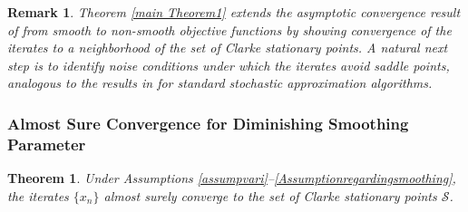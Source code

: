 \documentclass[9pt,journal,twoside,web]{ieeecolor}
\newtheorem{theorem}{Theorem}
\newtheorem{remark}{Remark}
\begin{document}
\begin{remark}
Theorem \ref{main Theorem1} extends the asymptotic convergence result of \cite{Ramaswami} from smooth to non-smooth objective functions by showing convergence of the iterates to a neighborhood of the set of Clarke stationary points. A natural next step is to identify noise conditions under which the iterates avoid saddle points, analogous to the results in \cite{pemantle1990nonconvergence} for standard stochastic approximation algorithms.
\end{remark}
\subsubsection{Almost Sure Convergence for Diminishing Smoothing Parameter}



\color{black}
\begin{theorem}
Under Assumptions \ref{assumpvari}--\ref{Assumptionregardingsmoothing}, the iterates $\{x_n\}$ almost surely converge to the set of Clarke stationary points $\mathcal{S}$.
\label{Thmdiminsihing}
\end{theorem}
\end{document}
